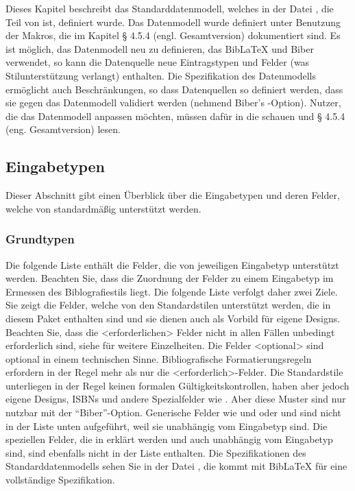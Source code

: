 \documentclass{ltxdockit}[2011/03/25]
\newcommand*{\biber}{Biber\xspace}
\newcommand*{\biblatex}{BibLaTeX\xspace}
\begin{document}
Dieses Kapitel beschreibt das Standarddatenmodell, welches in der Datei , die Teil von  ist, definiert wurde. Das Datenmodell wurde definiert unter Benutzung der Makros, die im Kapitel § 4.5.4 (engl. Gesamtversion) %
dokumentiert sind. Es ist möglich, das Datenmodell
neu zu definieren, das \biblatex und \biber verwendet, so kann die Datenquelle neue Eintragstypen und Felder (was Stilunterstützung verlangt) enthalten. Die Spezifikation des Datenmodells
ermöglicht auch Beschränkungen, so dass Datenquellen so definiert werden, dass sie gegen das Datenmodell validiert werden (nehmend \biber's -Option). 
Nutzer, die das Datenmodell anpassen möchten, müssen dafür in die 
schauen und § 4.5.4 (eng. Gesamtversion)
lesen.

\subsection{Eingabetypen} \label{bib:typ} 

Dieser Abschnitt gibt einen Überblick
über die Eingabetypen und deren Felder, welche von  standardmäßig 
unterstützt werden. 

\subsubsection{Grundtypen} \label{bib:typ:blx}

Die folgende Liste enthält die Felder, die von jeweiligen Eingabetyp unterstützt
werden. Beachten Sie, dass die Zuordnung der Felder zu einem Eingabetyp im
Ermessen des Biblografiestils liegt. Die folgende Liste verfolgt daher zwei
Ziele. Sie zeigt die Felder, welche von den Standardstilen unterstützt werden, die
in diesem Paket enthalten sind und sie dienen auch als Vorbild für eigene
Designs. Beachten Sie, dass die <erforderlichen> Felder nicht in allen Fällen
unbedingt erforderlich sind, siehe  für weitere
Einzelheiten. Die Felder <optional> sind optional in einem technischen Sinne.
Bibliografische Formatierungsregeln erfordern in der Regel mehr als nur die
<erforderlich>-Felder. Die Standardstile unterliegen in der Regel keinen
formalen Gültigkeitskontrollen, haben aber jedoch eigene Designs, ISBNs und 
andere Spezialfelder wie . Aber diese Muster sind nur nutzbar mit
der "`\biber {}"'-Option. Generische
Felder wie  und  oder 
und  sind nicht in der Liste unten aufgeführt, weil sie
unabhängig vom Eingabetyp sind. Die speziellen Felder, die in
 erklärt werden und auch unabhängig vom Eingabetyp sind,
sind ebenfalls nicht in der Liste enthalten.  Die Spezifikationen des Standarddatenmodells
sehen Sie in der Datei , die kommt mit \biblatex für eine vollständige
Spezifikation.
\end{document}
